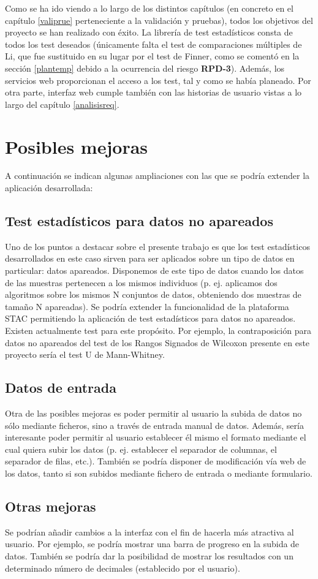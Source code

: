 Como se ha ido viendo a lo largo de los distintos capítulos (en concreto en el capítulo \ref{valiprue} perteneciente a la validación y pruebas), todos los objetivos del proyecto se han realizado con éxito. La librería de test estadísticos consta de todos los test deseados (únicamente falta el test de comparaciones múltiples de Li, que fue sustituido en su lugar por el test de Finner, como se comentó en la sección \ref{plantemp} debido a la ocurrencia del riesgo \textbf{RPD-3}). Además, los servicios web proporcionan el acceso a los test, tal y como se había planeado. Por otra parte, interfaz web cumple también con las historias de usuario vistas a lo largo del capítulo \ref{analisisreq}.

\section{Posibles mejoras}

A continuación se indican algunas ampliaciones con las que se podría extender la aplicación desarrollada:

\subsection{Test estadísticos para datos no apareados}
Uno de los puntos a destacar sobre el presente trabajo es que los test estadísticos desarrollados en este caso sirven para ser aplicados sobre un tipo de datos en particular: datos apareados. Disponemos de este tipo de datos cuando los datos de las muestras pertenecen a los mismos individuos (p. ej. aplicamos dos algoritmos sobre los mismos N conjuntos de datos, obteniendo dos muestras de tamaño N apareadas). Se podría extender la funcionalidad de la plataforma STAC permitiendo la aplicación de test estadísticos para datos no apareados. Existen actualmente test para este propósito. Por ejemplo, la contraposición para datos no apareados del test de los Rangos Signados de Wilcoxon presente en este proyecto sería el test U de Mann-Whitney.

\subsection{Datos de entrada}
Otra de las posibles mejoras es poder permitir al usuario la subida de datos no sólo mediante ficheros, sino a través de entrada manual de datos. Además, sería interesante poder permitir al usuario establecer él mismo el formato mediante el cual quiera subir los datos (p. ej. establecer el separador de columnas, el separador de filas, etc.). También se podría disponer de modificación vía web de los datos, tanto si son subidos mediante fichero de entrada o mediante formulario.

\subsection{Otras mejoras}
Se podrían añadir cambios a la interfaz con el fin de hacerla más atractiva al usuario. Por ejemplo, se podría mostrar una barra de progreso en la subida de datos. También se podría dar la posibilidad de mostrar los resultados con un determinado número de decimales (establecido por el usuario).